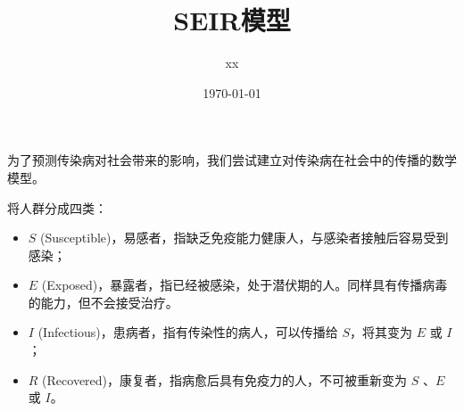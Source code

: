 \documentclass{ctexart}
\title{SEIR模型}
\date{\today}
\author{xx}
\numberwithin{equation}{section}    %
\begin{document}
\maketitle
    为了预测传染病对社会带来的影响，我们尝试建立对传染病在社会中的传播的数学模型。

    将人群分成四类：

    \begin{itemize}
        \item $S$ (Susceptible)，易感者，指缺乏免疫能力健康人，与感染者接触后容易受到感染；

        \item $E$ (Exposed)，暴露者，指已经被感染，处于潜伏期的人。同样具有传播病毒的能力，但不会接受治疗。
        
        \item $I$ (Infectious)，患病者，指有传染性的病人，可以传播给 $S$，将其变为 $E$ 或 $I$ ；
        
        \item $R$ (Recovered)，康复者，指病愈后具有免疫力的人，不可被重新变为 $S$ 、$E$ 或 $I$。
    \end{itemize}
\end{document}
